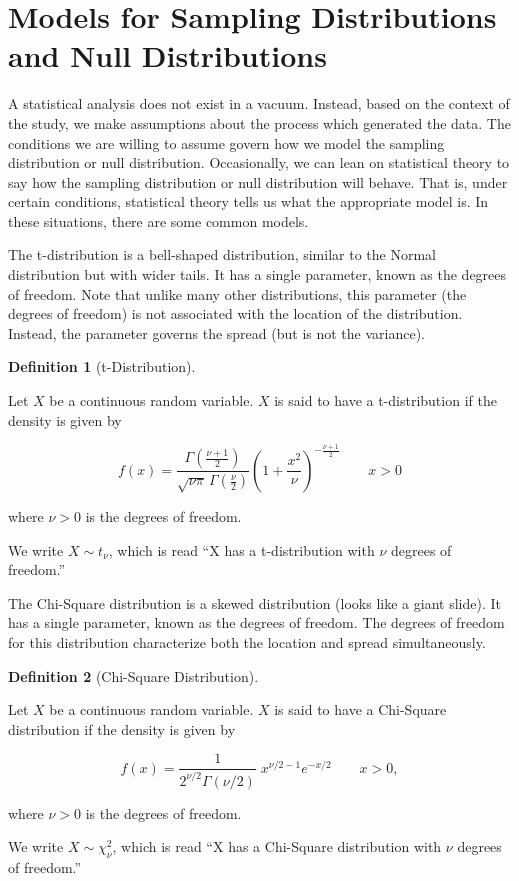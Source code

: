 \documentclass[
  letterpaper,
  DIV=11,
  numbers=noendperiod]{scrreprt}
\theoremstyle{definition}
\theoremstyle{definition}
\newtheorem{definition}{Definition}[chapter]
\theoremstyle{remark}
\begin{document}
\hypertarget{models-for-sampling-distributions-and-null-distributions}{%
\section{Models for Sampling Distributions and Null
Distributions}\label{models-for-sampling-distributions-and-null-distributions}}

A statistical analysis does not exist in a vacuum. Instead, based on the
context of the study, we make assumptions about the process which
generated the data. The conditions we are willing to assume govern how
we model the sampling distribution or null distribution. Occasionally,
we can lean on statistical theory to say how the sampling distribution
or null distribution will behave. That is, under certain conditions,
statistical theory tells us what the appropriate model is. In these
situations, there are some common models.

The t-distribution is a bell-shaped distribution, similar to the Normal
distribution but with wider tails. It has a single parameter, known as
the degrees of freedom. Note that unlike many other distributions, this
parameter (the degrees of freedom) is not associated with the location
of the distribution. Instead, the parameter governs the spread (but is
not the variance).

\begin{definition}[t-Distribution]\protect\hypertarget{def-t-distribution}{}\label{def-t-distribution}

Let \(X\) be a continuous random variable. \(X\) is said to have a
t-distribution if the density is given by

\[f(x) = \frac{\Gamma \left(\frac{\nu+1}{2} \right)} {\sqrt{\nu\pi}\,\Gamma \left(\frac{\nu}{2} \right)} \left(1+\frac{x^2}{\nu} \right)^{-\frac{\nu+1}{2}} \qquad x > 0\]

where \(\nu > 0\) is the degrees of freedom.

We write \(X \sim t_{\nu}\), which is read ``X has a t-distribution with
\(\nu\) degrees of freedom.''

\end{definition}

The Chi-Square distribution is a skewed distribution (looks like a giant
slide). It has a single parameter, known as the degrees of freedom. The
degrees of freedom for this distribution characterize both the location
and spread simultaneously.

\begin{definition}[Chi-Square
Distribution]\protect\hypertarget{def-chi-square-distribution}{}\label{def-chi-square-distribution}

Let \(X\) be a continuous random variable. \(X\) is said to have a
Chi-Square distribution if the density is given by

\[f(x) = \frac{1}{2^{\nu/2}\Gamma (\nu/2)}\;x^{\nu/2-1}e^{-x/2} \qquad x > 0,\]

where \(\nu > 0\) is the degrees of freedom.

We write \(X \sim \chi^2_{\nu}\), which is read ``X has a Chi-Square
distribution with \(\nu\) degrees of freedom.''

\end{definition}
\end{document}
